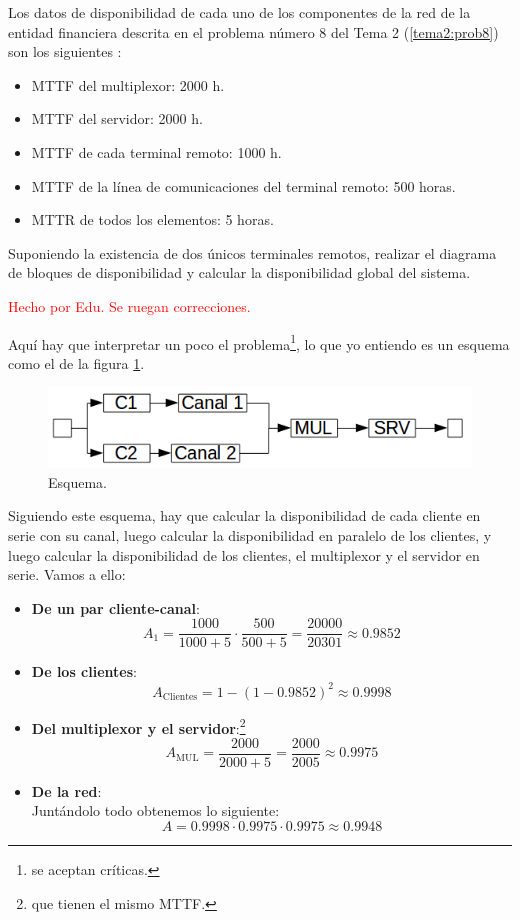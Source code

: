 \begin{problem}[4]
Los datos de disponibilidad de cada uno de los componentes de la red de la entidad financiera descrita en el problema número 8 del Tema 2 (\ref{tema2:prob8}) son los siguientes :
\begin{itemize}
	\item MTTF del multiplexor: 2000 h.
	\item MTTF del servidor: 2000 h.
	\item MTTF de cada terminal remoto: 1000 h.
	\item MTTF de la línea de comunicaciones del terminal remoto: 500 horas.
	\item MTTR de todos los elementos: 5 horas.
\end{itemize}

Suponiendo la existencia de dos únicos terminales remotos, realizar el diagrama de bloques de disponibilidad y calcular la disponibilidad global del sistema.

\solution
\textcolor{red}{Hecho por Edu. Se ruegan correcciones.}

Aquí hay que interpretar un poco el problema\footnote{se aceptan críticas.}, lo que yo entiendo es un esquema como el de la figura \ref{tema3:prob4:esquema}.
\begin{figure}[hbtp]
	\centering
	\includegraphics[keepaspectratio=true,width=\linewidth]{img/tema3_ej4.png}
	\caption{Esquema.}
	\label{tema3:prob4:esquema}
\end{figure}

Siguiendo este esquema, hay que calcular la disponibilidad de cada cliente en serie con su canal, luego calcular la disponibilidad en paralelo de los clientes, y luego calcular la disponibilidad de los clientes, el multiplexor y el servidor en serie. Vamos a ello:
\begin{itemize}
\item \textbf{De un par cliente-canal}:
\[ A_1 = \frac{1000}{1000+5} \cdot \frac{500}{500+5} = \frac{20000}{20301} \approx 0.9852 \]
\item \textbf{De los clientes}:
\[ A_{\text{Clientes}} = 1 - (1 - 0.9852)^2 \approx 0.9998 \]
\item \textbf{Del multiplexor y el servidor}:\footnote{que tienen el mismo MTTF.}
\[ A_{\text{MUL}} = \frac{2000}{2000+5} = \frac{2000}{2005} \approx 0.9975 \]
\item \textbf{De la red}:\\
Juntándolo todo obtenemos lo siguiente:
\[ A = 0.9998 \cdot 0.9975 \cdot 0.9975 \approx 0.9948 \]
\end{itemize}

\end{problem}

